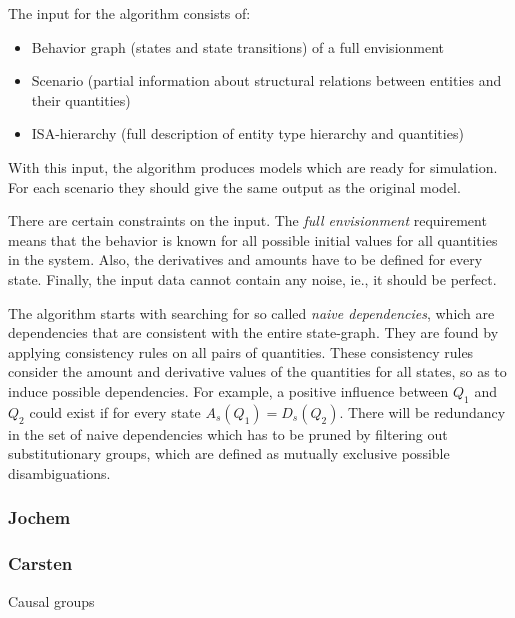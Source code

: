 \documentclass{article}
\begin{document}
The input for the algorithm consists of:

\begin{itemize}

\item Behavior graph (states and state transitions) of a full envisionment

\item Scenario (partial information about structural relations between entities and their quantities)

\item ISA-hierarchy (full description of entity type hierarchy and quantities)

\end{itemize}

With this input, the algorithm produces models which are ready for simulation.
For each scenario they should give the same output as the original model.

There are certain constraints on the input. The \emph{full envisionment}
requirement means that the behavior is known for all possible initial values for
all quantities in the system. Also, the derivatives and amounts have to be
defined for every state. Finally, the input data cannot contain any noise, 
ie., it should be perfect.

The algorithm starts with searching for so called \emph{naive dependencies},
which are dependencies that are consistent with the entire state-graph. They are
found by applying consistency rules on all pairs of quantities. These
consistency rules consider the amount and derivative values of the quantities
for all states, so as to induce possible dependencies. For example, a positive
influence between $Q_1$ and $Q_2$ could exist if for every state $A_s(Q_1) =
D_s(Q_2)$.  There will be redundancy in the set of naive dependencies which has
to be pruned by filtering out substitutionary groups, which are defined as
mutually exclusive possible disambiguations. 


\subsubsection{Jochem}

\subsubsection{Carsten}
Causal groups %
\end{document}
